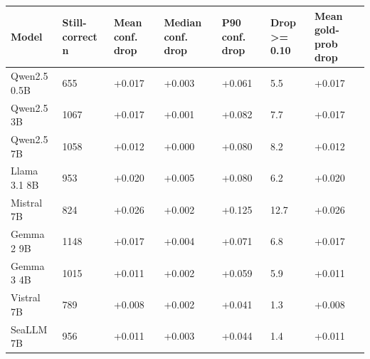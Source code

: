 \begin{tabular}{lllllll}
\toprule
       Model & Still-correct n & Mean conf. drop & Median conf. drop & P90 conf. drop & Drop >= 0.10 & Mean gold-prob drop \\
\midrule
Qwen2.5 0.5B &             655 &          +0.017 &            +0.003 &         +0.061 &          5.5 &              +0.017 \\
  Qwen2.5 3B &            1067 &          +0.017 &            +0.001 &         +0.082 &          7.7 &              +0.017 \\
  Qwen2.5 7B &            1058 &          +0.012 &            +0.000 &         +0.080 &          8.2 &              +0.012 \\
Llama 3.1 8B &             953 &          +0.020 &            +0.005 &         +0.080 &          6.2 &              +0.020 \\
  Mistral 7B &             824 &          +0.026 &            +0.002 &         +0.125 &         12.7 &              +0.026 \\
  Gemma 2 9B &            1148 &          +0.017 &            +0.004 &         +0.071 &          6.8 &              +0.017 \\
  Gemma 3 4B &            1015 &          +0.011 &            +0.002 &         +0.059 &          5.9 &              +0.011 \\
  Vistral 7B &             789 &          +0.008 &            +0.002 &         +0.041 &          1.3 &              +0.008 \\
   SeaLLM 7B &             956 &          +0.011 &            +0.003 &         +0.044 &          1.4 &              +0.011 \\
\bottomrule
\end{tabular}
